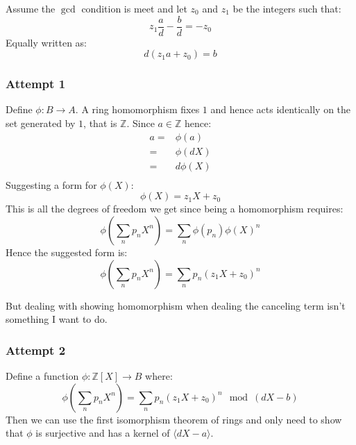 Assume the $\gcd$ condition is meet and let $z_0$ and $z_1$ be the integers such that:
\[z_1\frac{a}{d}-\frac{b}{d} = -z_0\]
Equally written as:
\[d(z_1a+z_0)=b\]

\subsubsection{Attempt 1}
Define $\phi: B \rightarrow A$.
A ring homomorphism fixes $1$ and hence acts identically on the set generated by $1$,
that is $\mathbb{Z}$.
Since $a\in\mathbb{Z}$ hence:
\begin{equation*}
\begin{aligned}
	a =& \phi(a) \\
	=&\phi(dX) \\
	=&d\phi(X) \\
\end{aligned}
\end{equation*}
Suggesting a form for $\phi(X)$:
\[\phi(X) = z_1X+z_0\]
This is all the degrees of freedom we get since being a homomorphism requires:
\[\phi\left(\sum_np_nX^n\right) = \sum_n\phi(p_n)\phi(X)^n\]
Hence the suggested form is:
\[\phi\left(\sum_np_nX^n\right) = \sum_np_n(z_1X+z_0)^n\]

But dealing with showing homomorphism when dealing the canceling term isn't something I want to do.

\subsubsection{Attempt 2}
Define a function $\phi: \mathbb{Z}[X] \rightarrow B$ where:
\[\phi\left(\sum_np_nX^n\right) = \sum_np_n(z_1X+z_0)^n\mod (dX-b)\]
Then we can use the first isomorphism theorem of rings and only need to show that $\phi$ is surjective and has a kernel of  $\langle dX-a \rangle$.
